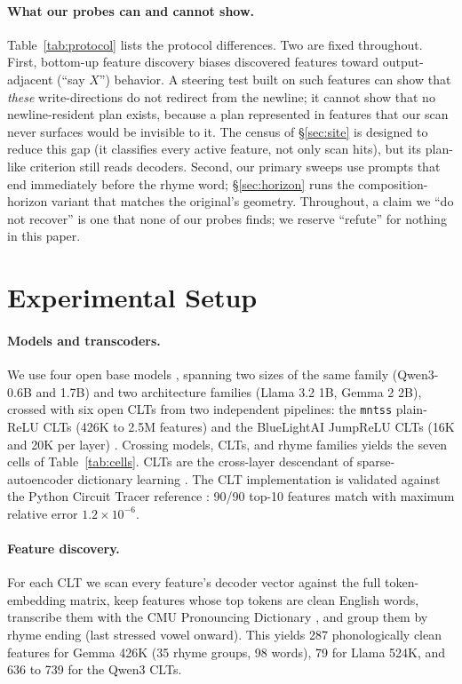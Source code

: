 \documentclass[11pt]{article}
\begin{document}
\paragraph{What our probes can and cannot show.}
Table~\ref{tab:protocol} lists the protocol differences. Two are fixed throughout. First, bottom-up feature discovery biases discovered features toward output-adjacent (``say $X$'') behavior. A steering test built on such features can show that \emph{these} write-directions do not redirect from the newline; it cannot show that no newline-resident plan exists, because a plan represented in features that our scan never surfaces would be invisible to it. The census of \S\ref{sec:site} is designed to reduce this gap (it classifies every active feature, not only scan hits), but its plan-like criterion still reads decoders. Second, our primary sweeps use prompts that end immediately before the rhyme word; \S\ref{sec:horizon} runs the composition-horizon variant that matches the original's geometry. Throughout, a claim we ``do not recover'' is one that none of our probes finds; we reserve ``refute'' for nothing in this paper.

\section{Experimental Setup}
\label{sec:setup}

\paragraph{Models and transcoders.}
We use four open base models \citep{gemma2024,llama32024,qwen32025}, spanning two sizes of the same family (Qwen3-0.6B and 1.7B) and two architecture families (Llama 3.2 1B, Gemma 2 2B), crossed with six open CLTs from two independent pipelines: the \texttt{mntss} plain-ReLU CLTs (426K to 2.5M features) and the BlueLightAI JumpReLU CLTs (16K and 20K per layer) \citep{mntssClt2025,bluelightaiClt2026}. Crossing models, CLTs, and rhyme families yields the seven cells of Table~\ref{tab:cells}. CLTs are the cross-layer descendant of sparse-autoencoder dictionary learning \citep{templeton2024scaling}. The CLT implementation is validated against the Python Circuit Tracer reference \citep{circuittracer2025}: 90/90 top-10 features match with maximum relative error $1.2\times10^{-6}$.

\paragraph{Feature discovery.}
For each CLT we scan every feature's decoder vector against the full token-embedding matrix, keep features whose top tokens are clean English words, transcribe them with the CMU Pronouncing Dictionary \citep{cmudict}, and group them by rhyme ending (last stressed vowel onward). This yields 287 phonologically clean features for Gemma 426K (35 rhyme groups, 98 words), 79 for Llama 524K, and 636 to 739 for the Qwen3 CLTs.
\end{document}
